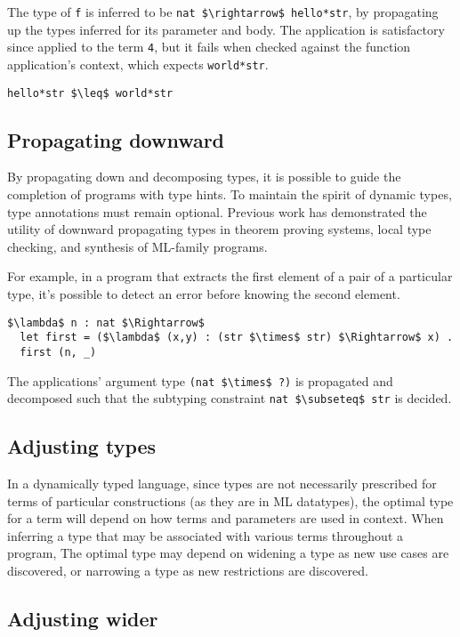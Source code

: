 \documentclass[sigplan,screen]{acmart}
\begin{document}
The type of \lstinline{f} is inferred to be \lstinline{nat $\rightarrow$ hello*str}, 
by propagating up the types inferred for its parameter and body.
The application is satisfactory since applied to the term \lstinline{4}, 
but it fails when checked against the function application's context,
which expects \lstinline{world*str}.
\begin{lstlisting}
hello*str $\leq$ world*str
\end{lstlisting}

\subsection{Propagating downward}
By propagating down and decomposing types, 
it is possible to guide the completion of programs with type hints.
To maintain the spirit of dynamic types, type annotations must remain optional.
Previous work has demonstrated the utility of downward propagating types 
in theorem proving systems, local type checking, 
and synthesis of ML-family programs.

For example, in a program that extracts 
the first element of a pair of a particular type, 
it's possible to detect an error before knowing the second element.

\begin{lstlisting}
$\lambda$ n : nat $\Rightarrow$
  let first = ($\lambda$ (x,y) : (str $\times$ str) $\Rightarrow$ x) .
  first (n, _) 
\end{lstlisting}

\noindent The  applications' argument type \lstinline{(nat $\times$ ?)} 
is propagated and decomposed such that the subtyping constraint 
\lstinline{nat $\subseteq$ str} is decided. 

\subsection{Adjusting types}

In a dynamically typed language, since types are not necessarily prescribed
for terms of particular constructions (as they are in ML datatypes), 
the optimal type for a term will depend on how terms and parameters are used in context. 
When inferring a type that may be associated with various terms throughout a program,  
The optimal type may depend on widening a type as new use cases are discovered,
or narrowing a type as new restrictions are discovered. 

\subsection{Adjusting wider}
\end{document}
